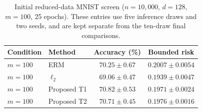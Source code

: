 \begin{table}[!ht]
\centering\footnotesize
\caption{Initial reduced-data MNIST screen ($n=10{,}000$, $d=128$, $m=100$, 25 epochs). These entries use five inference draws and two seeds, and are kept separate from the ten-draw final comparisons.}
\label{tab:app_screen_mnist}
\begin{tabular}{llcc}
\toprule
Condition & Method & Accuracy (\%) & Bounded risk\\
\midrule
$m=100$ & ERM & $70.25\pm0.67$ & $0.2007\pm0.0054$\\
$m=100$ & $\ell_2$ & $69.06\pm0.47$ & $\mathbf{0.1939\pm0.0047}$\\
$m=100$ & Proposed T1 & $\mathbf{70.82\pm0.53}$ & $0.1971\pm0.0024$\\
$m=100$ & Proposed T2 & $70.71\pm0.45$ & $0.1976\pm0.0016$\\
\bottomrule
\end{tabular}
\end{table}
